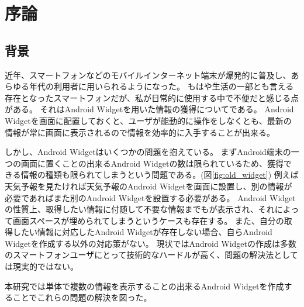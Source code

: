 \chapter{序論}
\label{chap:introduction}
\section{背景}


近年、スマートフォンなどのモバイルインターネット端末が爆発的に普及し、あらゆる年代の利用者に用いられるようになった。
もはや生活の一部とも言える存在となったスマートフォンだが、私が日常的に使用する中で不便だと感じる点がある。
それはAndroid Widgetを用いた情報の獲得についてである。
Android Widgetを画面に配置しておくと、ユーザが能動的に操作をしなくとも、最新の情報が常に画面に表示されるので情報を効率的に入手することが出来る。

しかし、Android Widgetはいくつかの問題を抱えている。
まずAndroid端末の一つの画面に置くことの出来るAndroid Widgetの数は限られているため、獲得できる情報の種類も限られてしまうという問題である。(図\ref{fig:old_widget})
例えば天気予報を見たければ天気予報のAndroid Widgetを画面に設置し、別の情報が必要であればまた別のAndroid Widgetを設置する必要がある。
Android Widgetの性質上、取得したい情報に付随して不要な情報までもが表示され、それによって画面スペースが埋められてしまうというケースも存在する。
また、自分の取得したい情報に対応したAndroid Widgetが存在しない場合、自らAndroid Widgetを作成する以外の対応策がない。
現状ではAndroid Widgetの作成は多数のスマートフォンユーザにとって技術的なハードルが高く、問題の解決法としては現実的ではない。

本研究では単体で複数の情報を表示することの出来るAndroid Widgetを作成することでこれらの問題の解決を図った。

